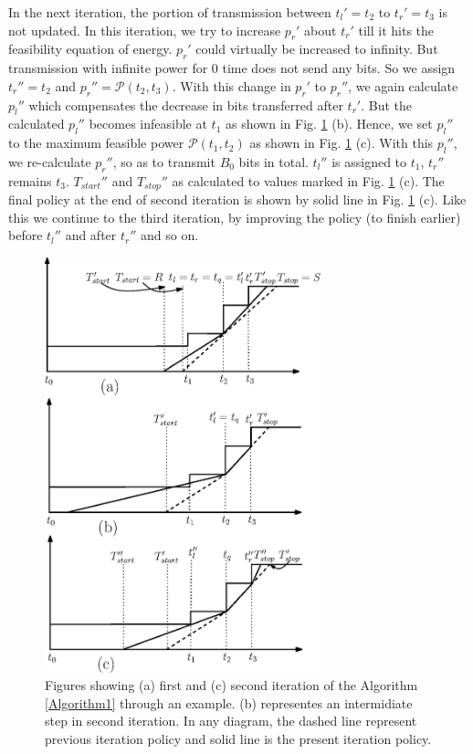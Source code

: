 In the next iteration, the portion of transmission between $t_l'=t_2$ to $t_r'=t_3$ is not updated. In this iteration, we try to increase $p_r'$ about $t_r'$ till it hits the feasibility equation of energy. $p_r'$ could virtually be increased to infinity. But transmission with infinite power for 0 time does not send any bits. So we assign $t_r''=t_2$ and $p_r''=\mathcal{P}(t_2,t_3)$. With this change in $p_r'$ to $p_r''$, we again calculate $p_l''$ which compensates the decrease in bits transferred after $t_r'$. But the calculated $p_l''$ becomes infeasible at $t_1$ as shown in Fig. \ref{figure_example_Algorithm1} (b). Hence, we set $p_l''$ to the maximum feasible power $\mathcal{P}(t_1,t_2)$ as shown in Fig. \ref{figure_example_Algorithm1} (c). With this $p_l''$, we re-calculate $p_r''$, so as to transmit $B_0$ bits in total. $t_l''$ is assigned to $t_1$, $t_r''$ remains $t_3$. $T_{start}''$ and $T_{stop}''$ as calculated to values marked in Fig. \ref{figure_example_Algorithm1} (c). The final policy at the end of second iteration is shown by solid line in Fig. \ref{figure_example_Algorithm1} (c). Like this we continue to the third iteration, by improving the policy (to finish earlier) before $t_l''$ and after $t_r''$ and so on.


\begin{figure}
\centering
  \centerline{\includegraphics[width=8cm]{example_algo1.eps}}
\caption{Figures showing (a) first  and (c) second iteration of the Algorithm \ref{Algorithm1} through an example. (b) representes an intermidiate step in second iteration. In any diagram, the dashed line represent previous iteration policy and solid line is the present iteration policy.}\label{figure_example_Algorithm1}
\end{figure}


